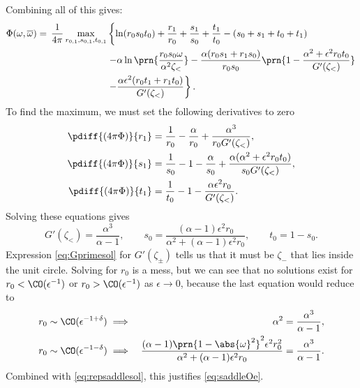 \documentclass[12pt]{article}
\newcommand{\inv}{^{-1}}
\newcommand{\omb}{\overline{\omega}}
\newcommand{\omo}{\prn{1-\abs{\omega}^2}}
\begin{document}
Combining all of this gives:
%
\begin{equation}\label{eq:phimaxrep}
\begin{aligned}
  \Phi(\omega,\omb) =\, \frac{1}{4\pi} \max_{r_{0,1},s_{0,1},t_{0,1}}& \left\{
    \ln(r_0s_0t_0) + \frac{r_1}{r_0} + \frac{s_1}{s_0} + \frac{t_1}{t_0}
    -(s_0 + s_1 + t_0 + t_1)
    \right.\\&\left.
    - \alpha\ln\prn{\frac{r_0s_0\omega}{\alpha^2\zeta_<}}
    - \frac{\alpha(r_0s_1+r_1s_0)}{r_0s_0}\prn{1-\frac{\alpha^2+\epsilon^2r_0t_0} {G'(\zeta_<)}}
    \right.\\&\left.
    - \frac{ \alpha\epsilon^2 (r_0t_1+r_1t_0)} {G'(\zeta_<)}
    \right\}.
\end{aligned}
\end{equation}
%
To find the maximum, we must set the following derivatives to zero
%
\begin{equation}\label{eq:phidiff1}
\begin{aligned}
  \pdiff{(4\pi\Phi)}{r_1} &= \frac{1}{r_0} - \frac{\alpha}{r_0} + \frac{\alpha^3}{r_0G'(\zeta_<)},  \\
  \pdiff{(4\pi\Phi)}{s_1} &= \frac{1}{s_0} - 1 - \frac{\alpha}{s_0} + \frac{\alpha(\alpha^2+\epsilon^2 r_0 t_0 )}{s_0G'(\zeta_<)},  \\
  \pdiff{(4\pi\Phi)}{t_1} &= \frac{1}{t_0} - 1 - \frac{\alpha\epsilon^2r_0}{G'(\zeta_<)}.
\end{aligned}
\end{equation}
%
Solving these equations gives
%
\begin{equation}\label{eq:repsaddlesol}
  G'(\zeta_<) = \frac{\alpha^3}{\alpha-1},
  \qquad
  s_0 = \frac{(\alpha-1)\epsilon^2r_0}{\alpha^2+(\alpha-1)\epsilon^2r_0},
  \qquad
  t_0 = 1 - s_0.
\end{equation}
%
Expression \eqref{eq:Gprimesol} for $G'(\zeta_\pm)$ tells us that it must be $\zeta_-$ that lies inside the unit circle.
Solving for $r_0$ is a mess, but we can see that no solutions exist for $r_0<\CO(\epsilon\inv)$ or $r_0>\CO(\epsilon\inv)$ as $\epsilon\to0$, because the last equation would reduce to
\begin{equation}\label{eq:rOe}
\begin{aligned}
  r_0 &\sim \CO(\epsilon^{-1+\delta})
   \implies &
   \alpha^2 &= \frac{\alpha^3}{\alpha-1}, \\
  r_0 &\sim \CO(\epsilon^{-1-\delta})
   \implies &
   \frac{(\alpha-1)\omo^2\epsilon^2r_0^2}{\alpha^2+(\alpha-1)\epsilon^2r_0} &= \frac{\alpha^3}{\alpha-1}. \\
\end{aligned}
\end{equation}
%
Combined with \eqref{eq:repsaddlesol}, this justifies \eqref{eq:saddleOe}.
\end{document}
